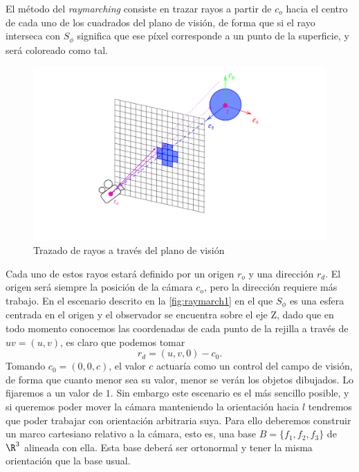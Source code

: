 El método del \textit{raymarching} consiste en trazar rayos a partir de $c_o$ hacia el centro de cada uno de los cuadrados del plano de visión, de forma que si el rayo interseca con $S_\phi$ significa que ese píxel corresponde a un punto de la superficie, y será coloreado como tal.
\begin{figure}[h]
    \centering
    \includegraphics[width=\textwidth]{Plantilla-TFG-master/img/raymarch_fix.png}
    \caption{Trazado de rayos a través del plano de visión}
    \label{fig:raymarch1}
\end{figure}
\newline

Cada uno de estos rayos estará definido por un origen $r_o$ y una dirección $r_d$. El origen será siempre la posición de la cámara $c_o$, pero la dirección requiere más trabajo. En el escenario descrito en la \autoref{fig:raymarch1} en el que $S_{\phi}$ es una esfera centrada en el origen y el observador se encuentra sobre el eje Z, dado que en todo momento conocemos las coordenadas de cada punto de la rejilla a través de $uv = (u,v)$, es claro que podemos tomar
$$r_d = (u,v,0) - c_0.$$ 
Tomando $c_0 = (0,0,c)$, el valor $c$ actuaría como un control del campo de visión, de forma que cuanto menor sea su valor, menor se verán los objetos dibujados. Lo fijaremos a un valor de $1$. Sin embargo este escenario es el más sencillo posible, y si queremos poder mover la cámara manteniendo la orientación hacia $l$ tendremos que poder trabajar con  orientación arbitraria suya. Para ello deberemos construir un marco cartesiano relativo a la cámara, esto es, una base $B=\{f_1,f_2,f_3\}$ de $\R^3$ alineada con ella. Esta base deberá ser ortonormal y tener la misma orientación que la base usual.\newline

